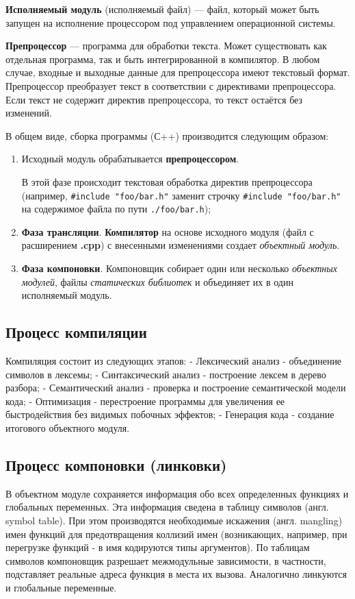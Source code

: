 \textbf{Исполняемый модуль} (исполняемый файл) --- файл, который может
быть запущен на исполнение процессором под управлением операционной
системы.

\textbf{Препроцессор} --- программа для обработки текста. Может
существовать как отдельная программа, так и быть интегрированной в
компилятор. В любом случае, входные и выходные данные для препроцессора
имеют текстовый формат. Препроцессор преобразует текст в соответствии с
директивами препроцессора. Если текст не содержит директив
препроцессора, то текст остаётся без изменений.

В общем виде, сборка программы (С++) производится следующим образом:

\begin{enumerate}
\def\labelenumi{\arabic{enumi})}
\item
  Исходный модуль обрабатывается \textbf{препроцессором}.

  В этой фазе происходит текстовая обработка директив препроцессора
  (например, \texttt{\#include\ "foo/bar.h"} заменит строчку
  \texttt{\#include\ "foo/bar.h"} на содержимое файла по пути
  \texttt{./foo/bar.h});
\item
  \textbf{Фаза трансляции}. \textbf{Компилятор} на основе исходного
  модуля (файл с расширением \textbf{.cpp}) с внесенными изменениями
  создает \emph{объектный модуль}.
\item
  \textbf{Фаза компоновки}. Компоновщик собирает один или несколько
  \emph{объектных модулей}, файлы \emph{статических библиотек} и
  объединяет их в один исполняемый модуль.
\end{enumerate}

\subsection{Процесс компиляции}

Компиляция состоит из следующих этапов: - Лексический анализ -
объединение символов в лексемы; - Синтаксический анализ - построение
лексем в дерево разбора; - Семантический анализ - проверка и построение
семантической модели кода; - Оптимизация - перестроение программы для
увеличения ее быстродействия без видимых побочных эффектов; - Генерация
кода - создание итогового объектного модуля.

\subsection{Процесс компоновки (линковки)}

В объектном модуле сохраняется информация обо всех определенных функциях
и глобальных переменных. Эта информация сведена в таблицу символов
(англ. symbol table). При этом производятся необходимые искажения (англ.
mangling) имен функций для предотвращения коллизий имен (возникающих,
например, при перегрузке функций - в имя кодируются типы аргументов). По
таблицам символов компоновщик разрешает межмодульные зависимости, в
частности, подставляет реальные адреса функция в места их вызова.
Аналогично линкуются и глобальные переменные.

